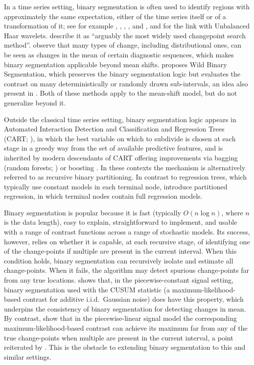 \documentclass[12pt, a4paper]{article}
\begin{document}
In a time series setting, binary segmentation is often used to identify regions with approximately the same expectation, either of the time series itself or of a transformation of it; see for example \cite{v81}, \cite{venkatraman1993}, \cite{b97}, \cite{ccs11}, \cite{cf12} and \cite{fsr11}, and \cite{f07a} for the link with Unbalanced Haar wavelets. \cite{kfe12} describe it as ``arguably the most widely used changepoint search method''. \cite{brodsky1993nonparametric} observe that many types of change, including distributional ones, can be seen as changes in the mean of certain diagnostic sequences, which makes binary segmentation applicable beyond mean shifts. \cite{f14a} proposes Wild Binary Segmentation, which preserves the binary segmentation logic but evaluates the contrast on many deterministically or randomly drawn sub-intervals, an idea also present in \cite{kbm23}. Both of these methods apply to the mean-shift model, but do not generalize beyond it.

Outside the classical time series setting, binary segmentation logic appears in Automated Interaction Detection \citep{ms63} and Classification and Regression Trees (CART; \cite{bfso84}), in which the best variable on which to subdivide is chosen at each stage in a greedy way from the set of available predictive features, and is inherited by modern descendants of CART offering improvements via bagging (random forests; \cite{b01}) or boosting \citep{f01, c16, kmfwcmyl17}. In these contexts the mechanism is alternatively referred to as recursive binary partitioning. In contrast to regression trees, which typically use constant models in each terminal node, \cite{hhz06} introduce partitioned regression, in which terminal nodes contain full regression models.

Binary segmentation is popular because it is fast (typically $O(n \log n)$, where $n$ is the data length), easy to explain, straightforward to implement, and usable with a range of contrast functions across a range of stochastic models. Its success, however, relies on whether it is capable, at each recursive stage, of identifying one of the change-points if multiple are present in the current interval. When this condition holds, binary segmentation can recursively isolate and estimate all change-points. When it fails, the algorithm may detect spurious change-points far from any true locations.
\cite{venkatraman1993} shows that, in the piecewise-constant signal setting, binary segmentation used with the CUSUM statistic (a maximum-likelihood-based contrast for additive i.i.d.\ Gaussian noise) does have this property, which underpins the consistency of binary segmentation for detecting changes in mean.
By contrast, \cite{bcf16} show that in the piecewise-linear signal model the corresponding maximum-likelihood-based contrast can achieve its maximum far from any of the true change-points when multiple are present in the current interval, a point reiterated by \cite{mfl19}. This is the obstacle to extending binary segmentation to this and similar settings.
\end{document}
